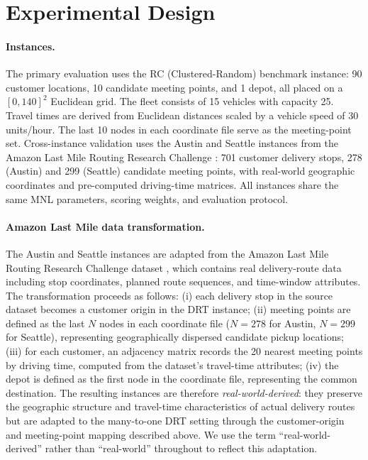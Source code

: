 \section{Experimental Design}
\label{sec:experiments}

\paragraph{Instances.} The primary evaluation uses the RC (Clustered-Random) benchmark instance: 90 customer locations, 10 candidate meeting points, and 1 depot, all placed on a $[0, 140]^2$ Euclidean grid. The fleet consists of 15 vehicles with capacity 25. Travel times are derived from Euclidean distances scaled by a vehicle speed of 30 units/hour. The last 10 nodes in each coordinate file serve as the meeting-point set. Cross-instance validation uses the Austin and Seattle instances from the Amazon Last Mile Routing Research Challenge \citep{merchan2024amazon}: 701 customer delivery stops, 278 (Austin) and 299 (Seattle) candidate meeting points, with real-world geographic coordinates and pre-computed driving-time matrices. All instances share the same MNL parameters, scoring weights, and evaluation protocol.

\paragraph{Amazon Last Mile data transformation.} The Austin and Seattle instances are adapted from the Amazon Last Mile Routing Research Challenge dataset \citep{merchan2024amazon}, which contains real delivery-route data including stop coordinates, planned route sequences, and time-window attributes. The transformation proceeds as follows: (i) each delivery stop in the source dataset becomes a customer origin in the DRT instance; (ii) meeting points are defined as the last $N$ nodes in each coordinate file ($N = 278$ for Austin, $N = 299$ for Seattle), representing geographically dispersed candidate pickup locations; (iii) for each customer, an adjacency matrix records the 20 nearest meeting points by driving time, computed from the dataset's travel-time attributes; (iv) the depot is defined as the first node in the coordinate file, representing the common destination. The resulting instances are therefore \emph{real-world-derived}: they preserve the geographic structure and travel-time characteristics of actual delivery routes but are adapted to the many-to-one DRT setting through the customer-origin and meeting-point mapping described above. We use the term ``real-world-derived'' rather than ``real-world'' throughout to reflect this adaptation.

